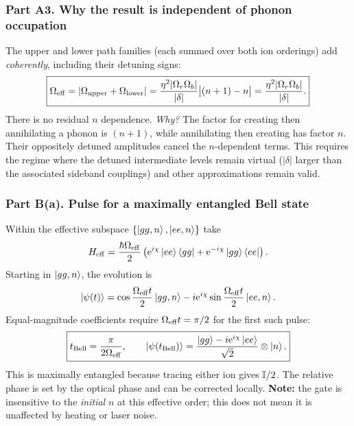 \subsubsection*{Part A3. Why the result is independent of phonon occupation}
The upper and lower path families (each summed over both ion orderings) add \emph{coherently}, including their detuning signs:
\begin{equation}\boxed{\displaystyle
\Omega_{\rm eff}=\left|\Omega_{\rm upper}+\Omega_{\rm lower}\right|
=\frac{\eta^2|\Omega_r\Omega_b|}{|\delta|}\big|(n+1)-n\big|
=\frac{\eta^2|\Omega_r\Omega_b|}{|\delta|}.}\label{eq:23MS}
\end{equation}
There is no residual $n$ dependence. \emph{Why?} The factor for creating then annihilating a phonon is $(n+1)$, while annihilating then creating has factor $n$. Their oppositely detuned amplitudes cancel the $n$-dependent terms. This requires the regime where the detuned intermediate levels remain virtual ($|\delta|$ larger than the associated sideband couplings) and other approximations remain valid.

\subsubsection*{Part B(a). Pulse for a maximally entangled Bell state}
Within the effective subspace $\{\left\lvert gg,n\right\rangle,\left\lvert ee,n\right\rangle\}$ take
\begin{equation}H_{\rm eff}=\frac{\hbar\Omega_{\rm eff}}2\left(\mathrm{e}^{i\chi}\left\lvert ee\right\rangle\left\langle gg\right\rvert+\mathrm{e}^{-i\chi}\left\lvert gg\right\rangle\left\langle ee\right\rvert\right).\end{equation}
Starting in $\left\lvert gg,n\right\rangle$, the evolution is
\begin{equation}
\left\lvert \psi(t)\right\rangle=\cos\frac{\Omega_{\rm eff}t}{2}\left\lvert gg,n\right\rangle
-i\mathrm{e}^{i\chi}\sin\frac{\Omega_{\rm eff}t}{2}\left\lvert ee,n\right\rangle.
\end{equation}
Equal-magnitude coefficients require $\Omega_{\rm eff}t=\pi/2$ for the first such pulse:
\begin{equation}\boxed{t_{\rm Bell}=\frac{\pi}{2\Omega_{\rm eff}},\qquad
\left\lvert \psi(t_{\rm Bell})\right\rangle=\frac{\left\lvert gg\right\rangle-i\mathrm{e}^{i\chi}\left\lvert ee\right\rangle}{\sqrt2}\otimes\left\lvert n\right\rangle.}\end{equation}
This is maximally entangled because tracing either ion gives $\mathbb{I}/2$. The relative phase is set by the optical phase and can be corrected locally. \textbf{Note:} the gate is insensitive to the \emph{initial} $n$ at this effective order; this does not mean it is unaffected by heating or laser noise.

